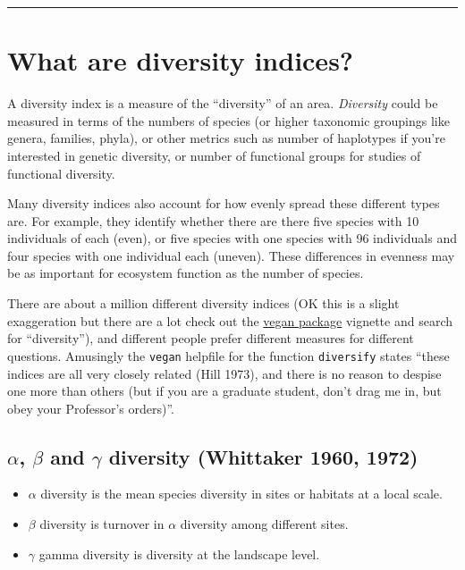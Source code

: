 \documentclass[]{book}
\providecommand{\tightlist}{%
  \setlength{\itemsep}{0pt}\setlength{\parskip}{0pt}}
\theoremstyle{definition}
\theoremstyle{definition}
\theoremstyle{definition}
\theoremstyle{remark}
\begin{document}
\begin{center}\rule{0.5\linewidth}{\linethickness}\end{center}

\section{What are diversity indices?}\label{what-are-diversity-indices}

A diversity index is a measure of the ``diversity'' of an area.
\emph{Diversity} could be measured in terms of the numbers of species
(or higher taxonomic groupings like genera, families, phyla), or other
metrics such as number of haplotypes if you're interested in genetic
diversity, or number of functional groups for studies of functional
diversity.

Many diversity indices also account for how evenly spread these
different types are. For example, they identify whether there are there
five species with 10 individuals of each (even), or five species with
one species with 96 individuals and four species with one individual
each (uneven). These differences in evenness may be as important for
ecosystem function as the number of species.

There are about a million different diversity indices (OK this is a
slight exaggeration but there are a lot check out the
\href{https://cran.r-project.org/web/packages/vegan/vegan.pdf}{vegan
package} vignette and search for ``diversity''), and different people
prefer different measures for different questions. Amusingly the
\texttt{vegan} helpfile for the function \texttt{diversify} states
``these indices are all very closely related (Hill 1973), and there is
no reason to despise one more than others (but if you are a graduate
student, don't drag me in, but obey your Professor's orders)''.

\subsection{\texorpdfstring{\(\alpha\), \(\beta\) and \(\gamma\)
diversity (Whittaker 1960,
1972)}{\textbackslash{}alpha, \textbackslash{}beta and \textbackslash{}gamma diversity (Whittaker 1960, 1972)}}\label{alpha-beta-and-gamma-diversity-whittaker-1960-1972}

\begin{itemize}
\tightlist
\item
  \(\alpha\) diversity is the mean species diversity in sites or
  habitats at a local scale.
\item
  \(\beta\) diversity is turnover in \(\alpha\) diversity among
  different sites.
\item
  \(\gamma\) gamma diversity is diversity at the landscape level.
\end{itemize}
\end{document}
